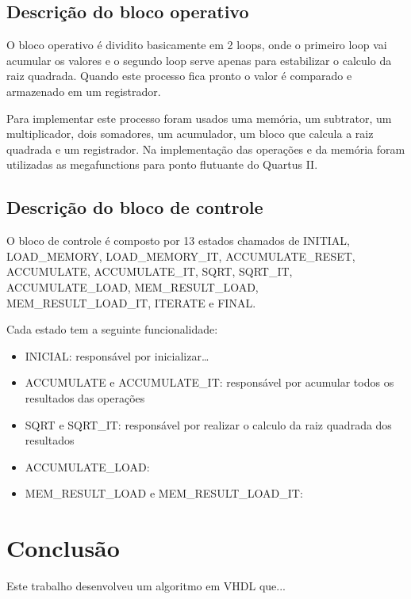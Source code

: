 \documentclass[12pt]{article}
\begin{document}
\subsection{Descrição do bloco operativo}

O bloco operativo é dividito basicamente em 2 loops, onde o primeiro loop vai acumular os valores
e o segundo loop serve apenas para estabilizar o calculo da raiz quadrada. Quando este processo
fica pronto o valor é comparado e armazenado em um registrador.

Para implementar este processo foram usados uma memória, um subtrator, um multiplicador, dois 
somadores, um acumulador, um bloco que calcula a raiz quadrada e um registrador.
Na implementação das operações e da memória foram utilizadas as megafunctions para ponto flutuante
do Quartus II. 




\subsection{Descrição do bloco de controle}

O bloco de controle é composto por 13 estados chamados de INITIAL, LOAD\_MEMORY, LOAD\_MEMORY\_IT, ACCUMULATE\_RESET, 
ACCUMULATE, ACCUMULATE\_IT, SQRT, SQRT\_IT, ACCUMULATE\_LOAD, MEM\_RESULT\_LOAD, MEM\_RESULT\_LOAD\_IT, ITERATE e FINAL.

Cada estado tem a seguinte funcionalidade:

\begin{itemize}

\item INICIAL: responsável por inicializar…
\item ACCUMULATE e ACCUMULATE\_IT: responsável por acumular todos os resultados das operações
\item SQRT e SQRT\_IT: responsável por realizar o calculo da raiz quadrada dos resultados
\item ACCUMULATE\_LOAD:
\item MEM\_RESULT\_LOAD e MEM\_RESULT\_LOAD\_IT:

\end{itemize}


\section{Conclus\~ao}\label{sec:figs}

Este trabalho desenvolveu um algoritmo em VHDL que...

\end{document}
